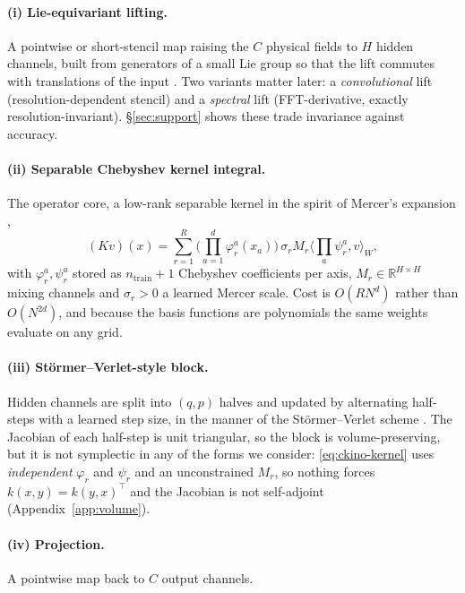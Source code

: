 \documentclass[11pt]{article}
\theoremstyle{definition}
\theoremstyle{remark}
\newcommand{\R}{\mathbb{R}}
\newcommand{\iprod}[2]{\langle #1, #2 \rangle}
\begin{document}
\paragraph{(i) Lie-equivariant lifting.} A pointwise or short-stencil map raising
the $C$ physical fields to $H$ hidden channels, built from generators of a small
Lie group so that the lift commutes with translations of the input
\citep{finzi2020lieconv}. Two variants matter later: a \emph{convolutional} lift
(resolution-dependent stencil) and a \emph{spectral} lift (FFT-derivative, exactly
resolution-invariant). \S\ref{sec:support} shows these trade invariance against
accuracy.

\paragraph{(ii) Separable Chebyshev kernel integral.} The operator core, a
low-rank separable kernel in the spirit of Mercer's expansion
\citep{mercer1909},
\begin{equation}
(Kv)(x)=\sum_{r=1}^{R}\Big(\textstyle\prod_{a=1}^{d}\varphi^a_r(x_a)\Big)\,
        \sigma_r M_r \iprod{\textstyle\prod_a\psi^a_r}{v}_W ,
\label{eq:ckino-kernel}
\end{equation}
with $\varphi^a_r,\psi^a_r$ stored as $n_{\mathrm{train}}{+}1$ Chebyshev
coefficients per axis, $M_r\in\R^{H\times H}$ mixing channels and $\sigma_r>0$ a
learned Mercer scale. Cost is $O(RN^d)$ rather than $O(N^{2d})$, and because the
basis functions are polynomials the same weights evaluate on any grid.

\paragraph{(iii) St\"ormer--Verlet-style block.} Hidden channels are split into
$(q,p)$ halves and updated by alternating half-steps with a learned step size,
in the manner of the St\"ormer--Verlet scheme \citep{verlet1967,hairer2006gni}.
The Jacobian of each half-step is unit triangular, so the block is
volume-preserving, but it is not symplectic in any of the forms we consider:
\eqref{eq:ckino-kernel} uses \emph{independent} $\varphi_r$ and $\psi_r$ and an
unconstrained $M_r$, so nothing forces $k(x,y)=k(y,x)^{\top}$ and the Jacobian is
not self-adjoint (Appendix~\ref{app:volume}).

\paragraph{(iv) Projection.} A pointwise map back to $C$ output channels.
\end{document}
